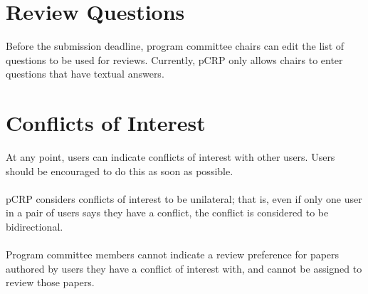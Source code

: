\documentclass[12pt]{article}
\begin{document}
\section{Review Questions}
	Before the submission deadline, program committee chairs can edit the
	list of questions to be used for reviews. Currently, pCRP only allows
	chairs to enter questions that have textual answers.

\section{Conflicts of Interest}
	At any point, users can indicate conflicts of interest with other users.
	Users should be encouraged to do this as soon as possible.
	\\\\
	pCRP considers conflicts of interest to be unilateral; that is, even if
	only one user in a pair of users says they have a conflict, the conflict
	is considered to be bidirectional.
	\\\\
	Program committee members cannot indicate a review preference for papers
	authored by users they have a conflict of interest with, and cannot be
	assigned to review those papers.



\end{document}
